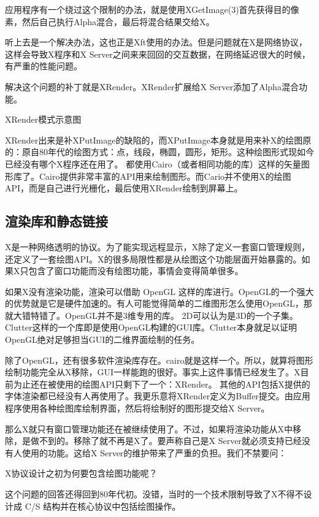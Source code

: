 应用程序有一个绕过这个限制的办法，就是使用XGetImage(3)首先获得目的像素，然后自己执行Alpha混合，最后将混合结果交给X。

听上去是一个解决办法，这也正是Xft使用的办法。但是问题就在X是网络协议，这样会导致X程序和X Server之间来来回回的交互数据，在网络延迟很大的时候，有严重的性能问题。

解决这个问题的补丁就是XRender。XRender扩展给X Server添加了Alpha混合功能。


XRender模式示意图

XRender出来是补XPutImage的缺陷的，而XPutImage本身就是用来补X的绘图原的：原自80年代的绘图方式：点，线段，椭圆，圆形，矩形。这种绘图形式现如今已经没有哪个X程序还在用了。
都使用Cairo（或者相同功能的库）这样的矢量图形库了。Cairo提供非常丰富的API用来绘制图形。而Cario并不使用X的绘图API，而是自己进行光栅化，最后使用XRender绘制到屏幕上。


\subsection{渲染库和静态链接}

X是一种网络透明的协议。为了能实现远程显示，X除了定义一套窗口管理规则，还定义了一套绘图API。X的很多局限性都是从绘图这个功能层面开始暴露的。如果X只包含了窗口功能而没有绘图功能，事情会变得简单很多。

如果X没有渲染功能，渲染可以借助 OpenGL 这样的库进行。OpenGL的一个强大的优势就是它是硬件加速的。有人可能觉得简单的二维图形怎么使用OpenGL，那就大错特错了。OpenGL并不是3维专用的库。
2D可以认为是3D的一个子集。Clutter这样的一个库即是使用OpenGL构建的GUI库。Clutter本身就足以证明OpenGL绝对足够担当GUI的二维界面绘制的任务。

除了OpenGL，还有很多软件渲染库存在。cairo就是这样一个。所以，就算将图形绘制功能完全从X移除，GUI一样能跑的很好。事实上这件事情已经发生了。X目前为止还在被使用的绘图API只剩下了一个：XRender。
其他的API包括X提供的字体渲染都已经没有人再使用了。我更乐意将XRender定义为Buffer提交。由应用程序使用各种绘图库绘制界面，然后将绘制好的图形提交给X Server。

那么X就只有窗口管理功能还在被继续使用了。不过，如果将渲染功能从X中移除，是做不到的。移除了就不再是X了。要声称自己是X Server就必须支持已经没有人使用的功能。这给X Server的维护带来了严重的负担。我们不禁要问：

\begin{center}
X协议设计之初为何要包含绘图功能呢？
\end{center}

这个问题的回答还得回到80年代初。没错，当时的一个技术限制导致了X不得不设计成 C/S 结构并在核心协议中包括绘图操作。

